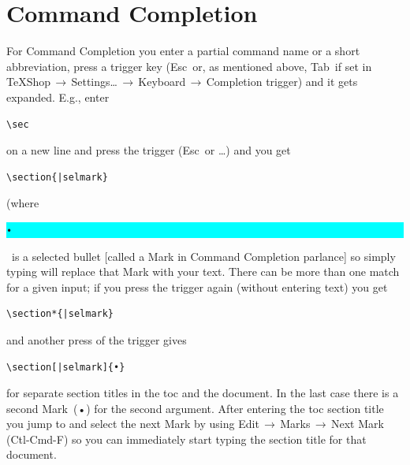 \documentclass[11pt]{article}
\newcommand{\esckey}{\textsf{Esc}}
\newcommand{\tabkey}{\textsf{Tab}}
\newcommand{\mnu}[1]{\textsf{#1}}
\newcommand{\cmd}[1]{\textsf{#1}}
\newcommand{\To}{\,\(\to\)\,}
\newcommand{\selmark}{\colorbox{cyan}{\rule[-0.5ex]{0ex}{2.1ex}\texttt{•}}}
\begin{document}
\section{\cmd{Command Completion}}

For \cmd{Command Completion} you enter a partial command name or a short abbreviation, press a trigger key (\esckey\ or, as mentioned above, \tabkey\ if set in \mnu{TeXShop}\To\mnu{Settings…}\To\mnu{Keyboard}\To\mnu{Completion trigger}) and it gets expanded. E.g., enter
\begin{verbatim}
\sec
\end{verbatim}
on a new line and press the trigger (\esckey\ or …) and you get
\begin{verbatim}
\section{|selmark}
\end{verbatim}
(where \selmark\ is a selected bullet [called a \cmd{Mark} in \cmd{Command Completion} parlance] so simply typing will replace that \cmd{Mark} with your text. There can be more than one match for a given input; if you press the trigger again (without entering text) you get
\begin{verbatim}
\section*{|selmark}
\end{verbatim}
and another press of the trigger gives
\begin{verbatim}
\section[|selmark]{•}
\end{verbatim}
for separate section titles in the \cmd{toc} and the document. In the last case there is a second \cmd{Mark}~(•) for the second argument. After entering the \cmd{toc} section title you jump to and select the next \cmd{Mark} by using \mnu{Edit}\To\mnu{Marks}\To\mnu{Next Mark} (\cmd{Ctl-Cmd-F}) so you can immediately start typing the section title for that document.
\end{document}

